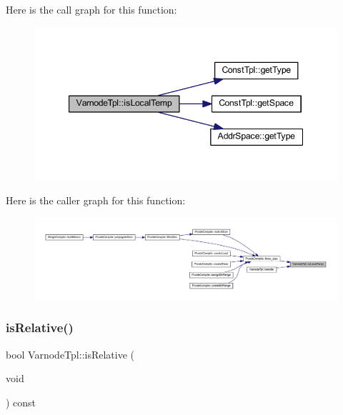 Here is the call graph for this function\+:
\nopagebreak
\begin{figure}[H]
\begin{center}
\leavevmode
\includegraphics[width=347pt]{class_varnode_tpl_a8f21f8da0ea1eae3995b90787849b592_cgraph}
\end{center}
\end{figure}
Here is the caller graph for this function\+:
\nopagebreak
\begin{figure}[H]
\begin{center}
\leavevmode
\includegraphics[width=350pt]{class_varnode_tpl_a8f21f8da0ea1eae3995b90787849b592_icgraph}
\end{center}
\end{figure}
\mbox{\label{class_varnode_tpl_acc2762c411899ba3a7801566aebdcbef}} 
\subsubsection{\texorpdfstring{isRelative()}{isRelative()}}
{\footnotesize\ttfamily bool Varnode\+Tpl\+::is\+Relative (\begin{DoxyParamCaption}\item[{void}]{ }\end{DoxyParamCaption}) const\hspace{0.3cm}{\ttfamily [inline]}}




